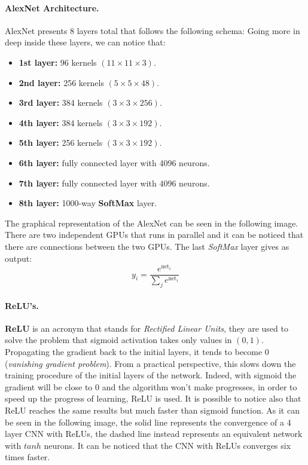 \paragraph*{AlexNet Architecture.} AlexNet presents 8 layers total that follows the following schema:
Going more in deep inside these layers, we can notice that:
\begin{itemize}
	\item \textbf{1st layer:} 96 kernels $(11 \times 11 \times 3)$.
	\item \textbf{2nd layer:} 256 kernels $(5 \times 5 \times 48)$.
	\item \textbf{3rd layer:} 384 kernels $(3 \times 3 \times 256)$.
	\item \textbf{4th layer:} 384 kernels $(3 \times 3 \times 192)$.
	\item \textbf{5th layer:} 256 kernels $(3 \times 3 \times 192)$.
	\item \textbf{6th layer:} fully connected layer with 4096 neurons.
	\item \textbf{7th layer:} fully connected layer with 4096 neurons.
	\item \textbf{8th layer:} 1000-way \textbf{SoftMax} layer.
\end{itemize}
The graphical representation of the AlexNet can be seen in the following image. There are two independent GPUs that runs in parallel and it can be noticed that there are connections between the two GPUs. The last \textit{SoftMax} layer gives as output:
$$y_i = \frac{e^{\text{net}_i}}{\sum_j e^{\text{net}_i}}$$

\paragraph*{ReLU's.} \textbf{ReLU} is an acronym that stands for \textit{Rectified Linear Units}, they are used to solve the problem that sigmoid activation takes only values in $(0,1)$. Propagating the gradient back to the initial layers, it tends to become $0$ (\textit{vanishing gradient problem}). From a practical perspective, this slows down the training procedure of the initial layers of the network. Indeed, with sigmoid the gradient will be close to 0 and the algorithm won't make progresses, in order to speed up the progress of learning, ReLU is used.
It is possible to notice also that ReLU reaches the same results but much faster than sigmoid function. As it can be seen in the following image, the solid line represents the convergence of a 4 layer CNN with ReLUs, the dashed line instead represents an equivalent network with $tanh$ neurons. It can be noticed that the CNN with ReLUs converges six times faster.

